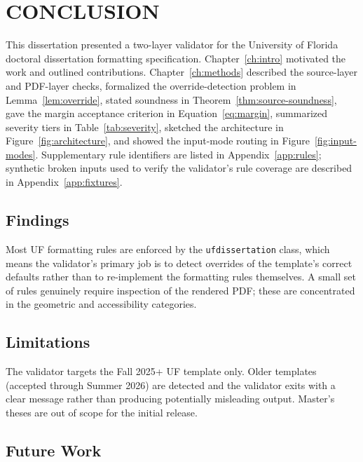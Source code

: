 
\chapter{CONCLUSION}\label{ch:conclusion}

This dissertation presented a two-layer validator for the University of
Florida doctoral dissertation formatting specification.
Chapter~\ref{ch:intro} motivated the work and outlined contributions.
Chapter~\ref{ch:methods} described the source-layer and PDF-layer
checks, formalized the override-detection problem in
Lemma~\ref{lem:override}, stated soundness in
Theorem~\ref{thm:source-soundness}, gave the margin acceptance
criterion in Equation~\ref{eq:margin}, summarized severity tiers in
Table~\ref{tab:severity}, sketched the architecture in
Figure~\ref{fig:architecture}, and showed the input-mode routing in
Figure~\ref{fig:input-modes}. Supplementary rule identifiers are
listed in Appendix~\ref{app:rules}; synthetic broken inputs used to
verify the validator's rule coverage are described in
Appendix~\ref{app:fixtures}.

\section{Findings}

Most UF formatting rules are enforced by the \texttt{ufdissertation}
class, which means the validator's primary job is to detect overrides
of the template's correct defaults rather than to re-implement the
formatting rules themselves. A small set of rules genuinely require
inspection of the rendered PDF; these are concentrated in the
geometric and accessibility categories.

\section{Limitations}

The validator targets the Fall 2025+ UF template only. Older templates
(accepted through Summer 2026) are detected and the validator exits
with a clear message rather than producing potentially misleading
output. Master's theses are out of scope for the initial release.

\section{Future Work}

